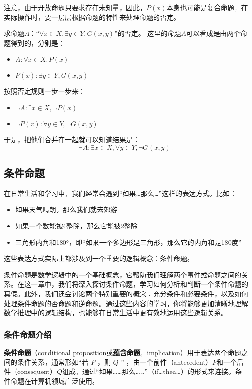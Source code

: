 注意，由于开放命题只要求存在未知量，因此，$P(x)$本身也可能是复合命题，在实际操作时，要一层层根据命题的特性来处理命题的否定。
\begin{exercise}{求命题$A$：“$\forall x\in X,\exists y\in Y,G(x,y)$”的否定。}
这里的命题$A$可以看成是由两个命题得到的，分别是：
\begin{itemize}
\item $A:\forall x\in X,P(x)$
\item $P(x):\exists y\in Y,G(x,y)$
\end{itemize}
按照否定规则一步一步来：
\begin{itemize}
\item $\lnot A:\exists x\in X,\lnot P(x)$
\item $\lnot P(x):\forall y\in Y,\lnot G(x,y)$
\end{itemize}
于是，把他们合并在一起就可以知道结果是：
$$
\lnot A:\exists x\in X,\forall y\in Y,\lnot G(x,y)~.
$$
\end{exercise}

\subsection{条件命题}\label{sub_HsCoPr_1}

在日常生活和学习中，我们经常会遇到“如果…那么…”这样的表达方式。比如：
\begin{itemize}
\item 如果天气晴朗，那么我们就去郊游
\item 如果一个数能被4整除，那么它能被2整除
\item 三角形内角和180°，即“如果一个多边形是三角形，那么它的内角和是180度”
\end{itemize}
这些表达方式实际上都涉及到一个重要的逻辑概念：条件命题。

条件命题是数学逻辑中的一个基础概念，它帮助我们理解两个事件或命题之间的关系。在这一章中，我们将深入探讨条件命题，学习如何分析和判断一个条件命题的真假。此外，我们还会讨论两个特别重要的概念：充分条件和必要条件，以及如何处理条件命题的否命题和逆命题。通过这些内容的学习，你将能够更加清晰地理解数学推理中的逻辑结构，也能够在日常生活中更有效地运用这些逻辑关系。

\subsubsection{条件命题介绍}

\textbf{条件命题}（conditional proposition或\textbf{蕴含命题}，implication）用于表达两个命题之间的条件关系，通常形如“若 $P$ ，则 $Q$ ” ，由一个前件（antecedent）$P$和一个后件（consequent）$Q$组成，通过“如果……那么……”（if…then…）的形式来连接。条件命题在计算机领域广泛使用。

